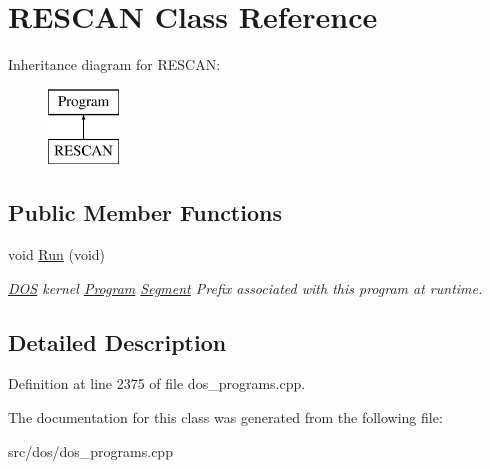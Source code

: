 \hypertarget{classRESCAN}{\section{R\-E\-S\-C\-A\-N Class Reference}
\label{classRESCAN}
}
Inheritance diagram for R\-E\-S\-C\-A\-N\-:\begin{figure}[H]
\begin{center}
\leavevmode
\includegraphics[height=2.000000cm]{classRESCAN}
\end{center}
\end{figure}
\subsection*{Public Member Functions}
\begin{DoxyCompactItemize}
\item 
\hypertarget{classRESCAN_af3bea53bb1105100a4703c239c701df6}{void \hyperlink{classRESCAN_af3bea53bb1105100a4703c239c701df6}{Run} (void)}\label{classRESCAN_af3bea53bb1105100a4703c239c701df6}

\begin{DoxyCompactList}\small\item\em \hyperlink{classDOS}{D\-O\-S} kernel \hyperlink{classProgram}{Program} \hyperlink{structSegment}{Segment} Prefix associated with this program at runtime. \end{DoxyCompactList}\end{DoxyCompactItemize}


\subsection{Detailed Description}


Definition at line 2375 of file dos\-\_\-programs.\-cpp.



The documentation for this class was generated from the following file\-:\begin{DoxyCompactItemize}
\item 
src/dos/dos\-\_\-programs.\-cpp\end{DoxyCompactItemize}
